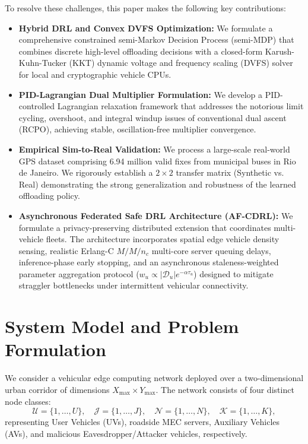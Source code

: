 \documentclass[12pt,a4paper]{article}
\begin{document}
To resolve these challenges, this paper makes the following key contributions:
\begin{itemize}
    \item \textbf{Hybrid DRL and Convex DVFS Optimization:} We formulate a comprehensive constrained semi-Markov Decision Process (semi-MDP) that combines discrete high-level offloading decisions with a closed-form Karush-Kuhn-Tucker (KKT) dynamic voltage and frequency scaling (DVFS) solver for local and cryptographic vehicle CPUs.
    \item \textbf{PID-Lagrangian Dual Multiplier Formulation:} We develop a PID-controlled Lagrangian relaxation framework that addresses the notorious limit cycling, overshoot, and integral windup issues of conventional dual ascent (RCPO), achieving stable, oscillation-free multiplier convergence.
    \item \textbf{Empirical Sim-to-Real Validation:} We process a large-scale real-world GPS dataset comprising 6.94 million valid fixes from municipal buses in Rio de Janeiro. We rigorously establish a $2 \times 2$ transfer matrix (Synthetic vs. Real) demonstrating the strong generalization and robustness of the learned offloading policy.
    \item \textbf{Asynchronous Federated Safe DRL Architecture (AF-CDRL):} We formulate a privacy-preserving distributed extension that coordinates multi-vehicle fleets. The architecture incorporates spatial edge vehicle density sensing, realistic Erlang-C $M/M/n_c$ multi-core server queuing delays, inference-phase early stopping, and an asynchronous staleness-weighted parameter aggregation protocol ($w_u \propto |\mathcal{D}_u| e^{-\alpha \tau_u}$) designed to mitigate straggler bottlenecks under intermittent vehicular connectivity.
\end{itemize}

\section{System Model and Problem Formulation}
\label{sec:system_model}

We consider a vehicular edge computing network deployed over a two-dimensional urban corridor of dimensions $X_{\max} \times Y_{\max}$. The network consists of four distinct node classes:
\[
\mathcal{U}=\{1,\dots,U\},\quad
\mathcal{J}=\{1,\dots,J\},\quad
\mathcal{N}=\{1,\dots,N\},\quad
\mathcal{K}=\{1,\dots,K\},
\]
representing User Vehicles (UVs), roadside MEC servers, Auxiliary Vehicles (AVs), and malicious Eavesdropper/Attacker vehicles, respectively. 
\end{document}
